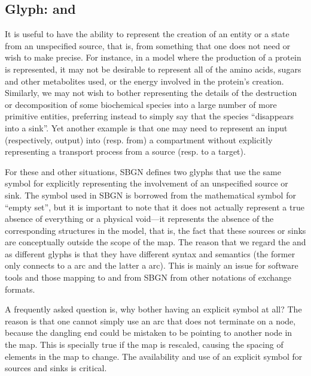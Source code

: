 \subsection{Glyph:  and }
\label{sec:sourceSink}

It is useful to have the ability to represent the creation of an entity or
a state from an unspecified source, that is, from something that one does
not need or wish to make precise.  For instance, in a model where the
production of a protein is represented, it may not be desirable to
represent all of the amino acids, sugars and other metabolites used, or the
energy involved in the protein's creation.  Similarly, we may not wish to
bother representing the details of the destruction or decomposition of some
biochemical species into a large number of more primitive entities,
preferring instead to simply say that the species ``disappears into a
sink''.  Yet another example is that one may need to represent an input
(respectively, output) into (resp. from) a compartment without explicitly
representing a transport process from a source (resp. to a target).

For these and other situations, SBGN defines two glyphs that use the same symbol for explicitly
representing the involvement of an unspecified source or sink.  The symbol
used in SBGN is borrowed from the mathematical symbol for ``empty set'',
but it is important to note that it does not actually represent a true
absence of everything or a physical void---it represents the absence of the
corresponding structures in the model, that is, the fact that these sources
or sinks are conceptually outside the scope of the map. The reason that we
regard the  and  as different glyphs is that they have different
syntax and semantics (the former only connects to a  arc and the latter
a  arc). This is mainly an issue for software tools and those mapping to
and from SBGN from other notations of exchange formats.

A frequently asked question is, why bother having an explicit symbol at
all?  The reason is that one cannot simply use an arc that does not
terminate on a node, because the dangling end could be mistaken to be
pointing to another node in the map.  This is specially true if the
map is rescaled, causing the spacing of elements in the map to
change.  The availability and use of an explicit symbol for sources and
sinks is critical.

